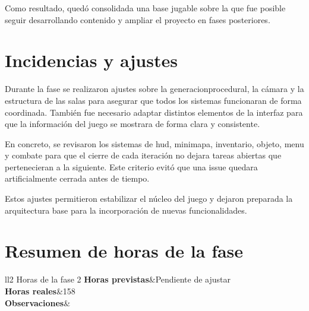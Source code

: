 Como resultado, quedó consolidada una base jugable sobre la que fue posible seguir desarrollando
contenido y ampliar el proyecto en fases posteriores.

\section{Incidencias y ajustes}
Durante la fase se realizaron ajustes sobre la \gls{generacionprocedural}, la cámara y la estructura de
las \glspl{sala} para asegurar que todos los sistemas funcionaran de forma coordinada. También fue necesario
adaptar distintos elementos de la interfaz para que la información del juego se mostrara de forma clara
y consistente.

En concreto, se revisaron los sistemas de \gls{hud}, \gls{minimapa}, \gls{inventario}, \gls{objeto}, \gls{menu} y \gls{combate} para que el cierre de cada iteración no dejara tareas abiertas que pertenecieran a la siguiente. Este criterio evitó que una issue quedara artificialmente cerrada antes de tiempo.

Estos ajustes permitieron estabilizar el núcleo del juego y dejaron preparada la arquitectura base
para la incorporación de nuevas funcionalidades.

\section{Resumen de horas de la fase}

\begin{table}[htb]
	\centering
	\begin{coolTable}{ll}{2}
{Horas de la fase 2}
	\textbf{Horas previstas}&Pendiente de ajustar\\
	\textbf{Horas reales}&158\\
	\textbf{Observaciones}&\\
	\end{coolTable}
	\caption{Resumen de horas de la Fase 2}
\end{table}
